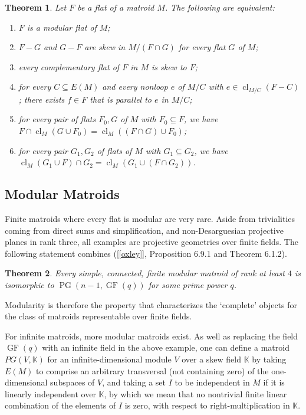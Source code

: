 \documentclass{amsart}
\theoremstyle{plain}
\newtheorem{theorem}{Theorem}[section]
\theoremstyle{definition}
\newcommand{\bK}{\mathbb K}
\DeclareMathOperator{\cl}{cl}
\DeclareMathOperator{\PG}{PG}
\DeclareMathOperator{\GF}{GF}
\newcommand{\con}{/}
\renewcommand{\ss}{\subseteq}
\begin{document}
\begin{theorem}
  Let $F$ be a flat of a matroid $M$. The following are equivalent: 
  \begin{enumerate}[(1)]
    \item $F$ is a modular flat of $M$;
    \item $F-G$ and $G-F$ are skew in $M \con (F \cap G)$ for every flat $G$ of $M$;
    \item every complementary flat of $F$ in $M$ is skew to $F$;
    \item
    for every $C \subseteq E(M)$ and every nonloop $e$ of $M \con C$ with $e \in \cl_{M \con C}(F-C)$;
    there exists $f \in F$ that is parallel to $e$ in $M \con C$;
    \item 
    for every pair of flats $F_0, G$ of $M$ with $F_0 \ss F$, we have $F \cap \cl_M(G \cup F_0) = \cl_M((F \cap G) \cup F_0)$;
    \item 
    for every pair $G_1,G_2$
    of flats of $M$ with $G_1 \ss G_2$, we have $\cl_M(G_1 \cup F) \cap G_2 = \cl_M(G_1 \cup (F \cap G_2))$. 
  \end{enumerate}
\end{theorem}

\subsection*{Modular Matroids}

Finite matroids where every flat is modular are very rare. 
Aside from trivialities coming from direct sums and simplification, 
and non-Desarguesian projective planes in rank three, all examples are projective geometries over finite fields. 
The following statement combines ([\ref{oxley}], Proposition 6.9.1 and Theorem 6.1.2). 

\begin{theorem}\label{modularpg}
  Every simple, connected, finite modular matroid of rank at least $4$ is isomorphic to $\PG(n-1,\GF(q))$ for some prime power $q$. 
\end{theorem}

Modularity is therefore the property that characterizes the `complete' objects 
for the class of matroids representable over finite fields.

For infinite matroids, more modular matroids exist. 
As well as replacing the field $\GF(q)$ with an infinite field in the above example,
one can define a matroid $PG(V,\bK)$ for an infinite-dimensional module $V$ over a skew field $\bK$ by taking 
$E(M)$ to comprise an arbitrary transversal (not containing zero) of the one-dimensional subspaces of $V$, 
and taking a set $I$ to be independent in $M$ if it is linearly independent over $\bK$, 
by which we mean that no nontrivial finite linear combination of the elements of $I$ is zero, 
with respect to right-multiplication in $\bK$.  
\end{document}
